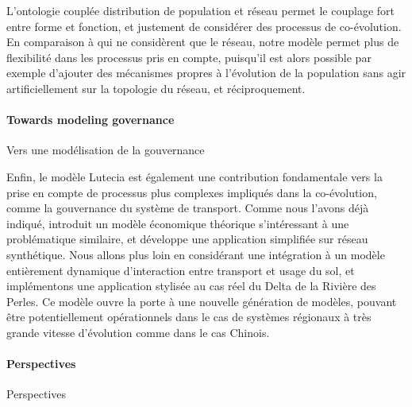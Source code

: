 L'ontologie couplée distribution de population et réseau permet le couplage fort entre forme et fonction, et justement de considérer des processus de co-évolution. En comparaison à \cite{barthelemy2009co} qui ne considèrent que le réseau, notre modèle permet plus de flexibilité dans les processus pris en compte, puisqu'il est alors possible par exemple d'ajouter des mécanismes propres à l'évolution de la population sans agir artificiellement sur la topologie du réseau, et réciproquement.

\paragraph{Towards modeling governance}{Vers une modélisation de la gouvernance}


Enfin, le modèle Lutecia est également une contribution fondamentale vers la prise en compte de processus plus complexes impliqués dans la co-évolution, comme la gouvernance du système de transport. Comme nous l'avons déjà indiqué, \cite{Xie2011} introduit un modèle économique théorique s'intéressant à une problématique similaire, et \cite{xie2011governance} développe une application simplifiée sur réseau synthétique. Nous allons plus loin en considérant une intégration à un modèle entièrement dynamique d'interaction entre transport et usage du sol, et implémentons une application stylisée au cas réel du Delta de la Rivière des Perles. Ce modèle ouvre la porte à une nouvelle génération de modèles, pouvant être potentiellement opérationnels dans le cas de systèmes régionaux à très grande vitesse d'évolution comme dans le cas Chinois.



\paragraph{Perspectives}{Perspectives}




